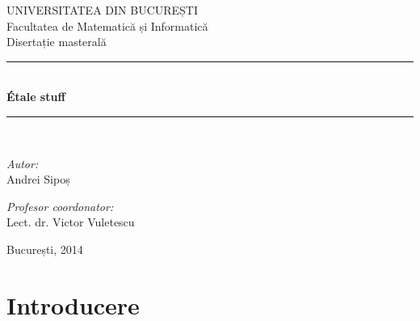 \documentclass[13pt,openany]{book}
\begin{document}
\newtheorem{teo}{\bf Teorema}[chapter]
\newtheorem{cor}[teo]{\bf Corolarul}
\newtheorem{lema}[teo]{\bf Lema}
\newtheorem{prob}[teo]{\bf Problema}
\newtheorem{conj}[teo]{\bf Conjectura}
\newtheorem{propr}[teo]{\bf Proprietatea}
\newtheorem{prop}[teo]{\bf Propoziția}
\newtheorem{alg}[teo]{\bf Algoritmul}
\theoremstyle{remark}
\newtheorem{obs}[teo]{\bf Observația}
\newtheorem{obss}[teo]{\bf Observațiile}
\newtheorem{ex}[teo]{\bf Exemplul}
\newtheorem{exs}[teo]{\bf Exemplele}
\theoremstyle{definition}
\newtheorem{defi}[teo]{\bf Definiția}

\setcounter{page}{1}
\fontsize{3.9mm}{5mm}\selectfont
\pagestyle{empty}
\begin{center}

\LARGE UNIVERSITATEA DIN BUCUREȘTI\\[0.5cm]
\LARGE Facultatea de Matematică și Informatică\\[3cm]

\Large Disertație masterală\\[3.5cm] 
 
\rule{8cm}{0.5mm}\\[0.8cm]
{ \huge \bfseries Étale stuff}\\[0.2cm]
\rule{8cm}{0.5mm}\\[2.5cm]

\begin{minipage}{0.4\textwidth}
\begin{flushleft} \large
\emph{Autor:}\\
Andrei Sipoș
\end{flushleft}
\end{minipage}
\begin{minipage}{0.5\textwidth}
\begin{flushright} \large
\emph{Profesor coordonator:} \\
Lect. dr. Victor Vuletescu
\end{flushright}
\end{minipage}

\vfill

{\large București, 2014}

\end{center}
\newpage
\phantom{X}
\newpage

\tableofcontents

\newpage
\phantom{X}
\newpage

\setlength{\parskip}{1.5ex plus 0.5ex minus 0.2ex}
\chapter{Introducere}
\end{document}
